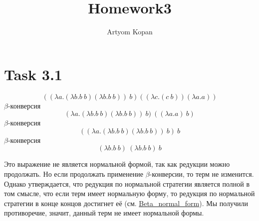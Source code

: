 \documentclass{article}
\title{Homework3}
\author{Artyom Kopan}
\begin{document}
    \huge
    \maketitle

    \section{Task 3.1}
    \begin{equation}
        ((\lambda a.(\lambda b.b\:b)(\lambda b.b\:b))\:b)((\lambda c.(c\:b))(\lambda a.a))
    \end{equation}
    $\beta$-конверсия
    \begin{equation}
        (\lambda a.(\lambda b.b\:b)(\lambda b.b\:b))\:b)\:((\lambda a.a)\:b)
    \end{equation}
    $\beta$-конверсия
    \begin{equation}
        ((\lambda a.(\lambda b.b\:b)(\lambda b.b\:b))\:b)\:b
    \end{equation}
    $\beta$-конверсия
    \begin{equation}
    (\lambda b.b\:b)\:(\lambda b.b\:b)\:b
    \end{equation}

    Это выражение не является нормальной формой, так как редукции можно продолжать. Но если продолжать применение $\beta$-конверсии, то терм не изменится. Однако утверждается, что редукция по нормальной стратегии является полной в том смысле, что если терм имеет нормальную форму, то редукция по нормальной стратегии в конце концов достигнет её (см. \href{https://en.wikipedia.org/wiki/Beta\_normal\_form}{Beta\_normal\_form}).
    Мы получили противоречие, значит, данный терм не имеет нормальной формы.
\end{document}
